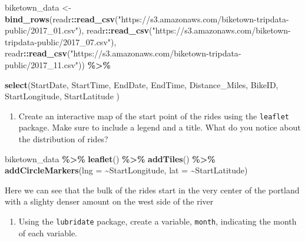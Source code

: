 \documentclass[
]{article}
\newenvironment{Shaded}{\begin{snugshade}}{\end{snugshade}}
\newcommand{\AttributeTok}[1]{\textcolor[rgb]{0.13,0.29,0.53}{#1}}
\newcommand{\FunctionTok}[1]{\textcolor[rgb]{0.13,0.29,0.53}{\textbf{#1}}}
\newcommand{\NormalTok}[1]{#1}
\newcommand{\OtherTok}[1]{\textcolor[rgb]{0.56,0.35,0.01}{#1}}
\newcommand{\SpecialCharTok}[1]{\textcolor[rgb]{0.81,0.36,0.00}{\textbf{#1}}}
\newcommand{\StringTok}[1]{\textcolor[rgb]{0.31,0.60,0.02}{#1}}
\providecommand{\tightlist}{%
  \setlength{\itemsep}{0pt}\setlength{\parskip}{0pt}}
\begin{document}
\begin{Shaded}
\begin{Highlighting}[]
\NormalTok{biketown\_data }\OtherTok{\textless{}{-}} \FunctionTok{bind\_rows}\NormalTok{(readr}\SpecialCharTok{::}\FunctionTok{read\_csv}\NormalTok{(}\StringTok{"https://s3.amazonaws.com/biketown{-}tripdata{-}public/2017\_01.csv"}\NormalTok{),}
\NormalTok{                           readr}\SpecialCharTok{::}\FunctionTok{read\_csv}\NormalTok{(}\StringTok{"https://s3.amazonaws.com/biketown{-}tripdata{-}public/2017\_07.csv"}\NormalTok{),}
\NormalTok{                           readr}\SpecialCharTok{::}\FunctionTok{read\_csv}\NormalTok{(}\StringTok{"https://s3.amazonaws.com/biketown{-}tripdata{-}public/2017\_11.csv"}\NormalTok{)) }\SpecialCharTok{\%\textgreater{}\%}
  

  \FunctionTok{select}\NormalTok{(StartDate, StartTime, EndDate, EndTime, Distance\_Miles,}
\NormalTok{         BikeID, StartLongitude, StartLatitude )}
\end{Highlighting}
\end{Shaded}

\begin{enumerate}
\def\labelenumi{\alph{enumi}.}
\setcounter{enumi}{1}
\tightlist
\item
  Create an interactive map of the start point of the rides using the
  \texttt{leaflet} package. Make sure to include a legend and a title.
  What do you notice about the distribution of rides?
\end{enumerate}

\begin{Shaded}
\begin{Highlighting}[]
\NormalTok{biketown\_data }\SpecialCharTok{\%\textgreater{}\%} 
  \FunctionTok{leaflet}\NormalTok{() }\SpecialCharTok{\%\textgreater{}\%}
  \FunctionTok{addTiles}\NormalTok{() }\SpecialCharTok{\%\textgreater{}\%}
  \FunctionTok{addCircleMarkers}\NormalTok{(}\AttributeTok{lng =} \SpecialCharTok{\textasciitilde{}}\NormalTok{StartLongitude, }\AttributeTok{lat =} \SpecialCharTok{\textasciitilde{}}\NormalTok{StartLatitude)}
\end{Highlighting}
\end{Shaded}

Here we can see that the bulk of the rides start in the very center of
the portland with a slighty denser amount on the west side of the river

\begin{enumerate}
\def\labelenumi{\alph{enumi}.}
\setcounter{enumi}{2}
\tightlist
\item
  Using the \texttt{lubridate} package, create a variable,
  \texttt{month}, indicating the month of each variable.
\end{enumerate}
\end{document}
